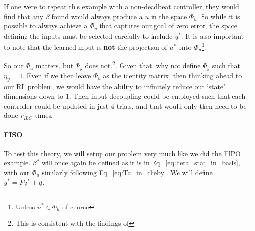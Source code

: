 If one were to repeat this example with a non-deadbeat controller, they would find that any $\beta$ found would always produce a $\underline{u}$ in the space $\Phi_u$. So while it is possible to always achieve a $\Phi_y$ that captures our goal of zero error, the space defining the inputs must be selected carefully to include $\underline{u}^\ast$. It is also important to note that the learned input is \textbf{not} the projection of $\underline{u}^\ast$ onto $\Phi_u$\footnote{Unless $\underline{u}^\ast \in \Phi_u$ of course}.

So our $\Phi_u$ matters, but $\Phi_y$ does not.\footnote{This is consistent with the findings of }. Given that, why not define $\Phi_y$ such that $\eta_y = 1$. Even if we then leave $\Phi_u$ as the identity matrix, then thinking ahead to our RL problem, we would have the ability to infinitely reduce our `state' dimensions down to $1$. Then input-decoupling could be employed such that each controller could be updated in just $4$ trials, and that would only then need to be done $r_{ILC}$ times. 

\FloatBarrier\paragraph{\ac{FISO}}
To test this theory, we will setup our problem very much like we did the FIPO example. $\beta^\ast$ will once again be defined as it is in Eq.~\ref{eq:beta_star_in_basis}, with our $\Phi_u$ similarly following Eq.~\ref{eq:Tu_in_cheby}. We will define $\underline{y}^\ast = P\underline{u}^\ast + \underline{d}$.

